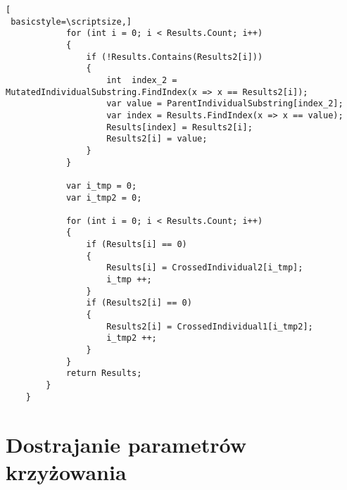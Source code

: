 \begin{program}[h!]
\begin{lstlisting}[
 basicstyle=\scriptsize,]
            for (int i = 0; i < Results.Count; i++)
            {
                if (!Results.Contains(Results2[i]))
                {
                    int  index_2 = MutatedIndividualSubstring.FindIndex(x => x == Results2[i]);
                    var value = ParentIndividualSubstring[index_2];
                    var index = Results.FindIndex(x => x == value);
                    Results[index] = Results2[i];
                    Results2[i] = value;
                }
            }

            var i_tmp = 0;
            var i_tmp2 = 0;

            for (int i = 0; i < Results.Count; i++)
            {
                if (Results[i] == 0)
                {
                    Results[i] = CrossedIndividual2[i_tmp];
                    i_tmp ++;
                }
                if (Results2[i] == 0)
                {
                    Results2[i] = CrossedIndividual1[i_tmp2];
                    i_tmp2 ++;
                }
            }
            return Results;
        }
    }
\end{lstlisting}
\end{program}



























\section{Dostrajanie parametrów krzyżowania}\label{dostrajaniecr}
